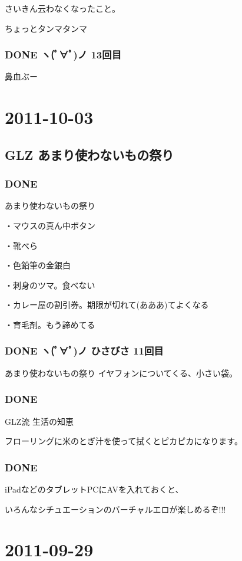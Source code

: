 \documentclass[11pt]{article}
\begin{document}
さいきん云わなくなったこと。

ちょっとタンマタンマ
\subsubsection{\textbf{DONE} ヽ(ﾟ∀ﾟ)ノ 13回目}
\label{sec-62_2_7}

鼻血ぶー
\section{2011-10-03}
\label{sec-63}
\subsection{GLZ あまり使わないもの祭り}
\label{sec-63_1}
\subsubsection{\textbf{DONE}}
\label{sec-63_1_1}

あまり使わないもの祭り

・マウスの真ん中ボタン

・靴べら

・色鉛筆の金銀白

・刺身のツマ。食べない


・カレー屋の割引券。期限が切れて(あああ)てよくなる

・育毛剤。もう諦めてる
\subsubsection{\textbf{DONE} ヽ(ﾟ∀ﾟ)ノ ひさびさ 11回目}
\label{sec-63_1_2}

あまり使わないもの祭り
イヤフォンについてくる、小さい袋。
\subsubsection{\textbf{DONE}}
\label{sec-63_1_3}

GLZ流 生活の知恵

フローリングに米のとぎ汁を使って拭くとピカピカになります。
\subsubsection{\textbf{DONE}}
\label{sec-63_1_4}

iPadなどのタブレットPCにAVを入れておくと、

いろんなシチュエーションのバーチャルエロが楽しめるぞ!!!
\section{2011-09-29}
\label{sec-64}
\end{document}

